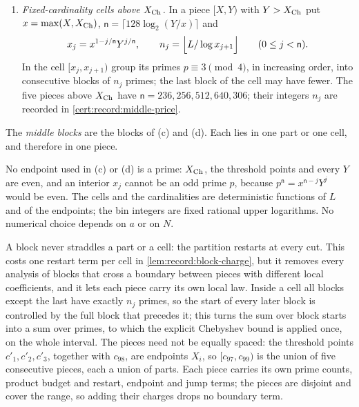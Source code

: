 \begin{definition}
\begin{enumerate}[label=(\alph*)]
 $p\equiv3\pmod4$ in increasing order. A prime joins the current block if
 the sum of $\mathfrak u$ over the block stays at most $\mathfrak u_*$;
 otherwise it starts a new block. The last block of a part is closed at the
 end of the part.
\item \emph{Fixed-cardinality cells above $X_{\rm Ch}$.} In a piece $[X,Y)$
 with $Y>X_{\rm Ch}$ put $x=\max(X,X_{\rm Ch})$,
 $\mathsf n=\lceil128\log_2(Y/x)\rceil$ and
 \[
  x_j=x^{1-j/\mathsf n}Y^{j/\mathsf n},\qquad
  n_j=\Bigl\lfloor\frac L{\log x_{j+1}}\Bigr\rfloor\qquad(0\le j<\mathsf n).
 \]
 In the cell $[x_j,x_{j+1})$ group its primes $p\equiv3\pmod4$, in
 increasing order, into consecutive blocks of $n_j$ primes; the last
 block of the cell may have fewer. The five pieces above $X_{\rm Ch}$ have
 $\mathsf n=236,256,512,640,306$; their integers $n_j$ are recorded in
 \cref{cert:record:middle-price}.
\end{enumerate}
The \emph{middle blocks} are the blocks of (c) and (d). Each lies in one
part or one cell, and therefore in one piece.
\end{definition}

No endpoint used in (c) or (d) is a prime: $X_{\rm Ch}$, the threshold points and every
$Y$ are even, and an interior $x_j$ cannot be an odd prime $p$, because
$p^{\mathsf n}=x^{\mathsf n-j}Y^j$ would be even. The cells and the
cardinalities are deterministic functions of $L$ and of the endpoints; the
bin integers are fixed rational upper logarithms. No numerical choice
depends on $a$ or on $N$.

\begin{remark}
\label{rem:middle-restarts}
A block never straddles a part or a cell: the partition restarts at every
cut. This costs one restart term per cell in \cref{lem:record:block-charge},
but it removes every analysis of blocks that cross a boundary between
pieces with different local coefficients, and it lets each piece carry its
own local law. Inside a cell all blocks except the last have exactly $n_j$
primes, so the start of every later block is controlled by the full block
that precedes it; this turns the sum over block starts into a sum over
primes, to which the explicit Chebyshev bound is applied once, on the whole
interval.
The pieces need not be equally spaced: the threshold points $c'_1,c'_2,c'_3$, together with
$c_{98}$, are endpoints $X_i$, so $[c_{97},c_{99})$ is the union of five
consecutive pieces, each a union of parts. Each piece carries its own prime
counts, product
budget and restart, endpoint and jump terms; the pieces are disjoint and cover
the range, so adding their charges drops no boundary term.
\end{remark}

